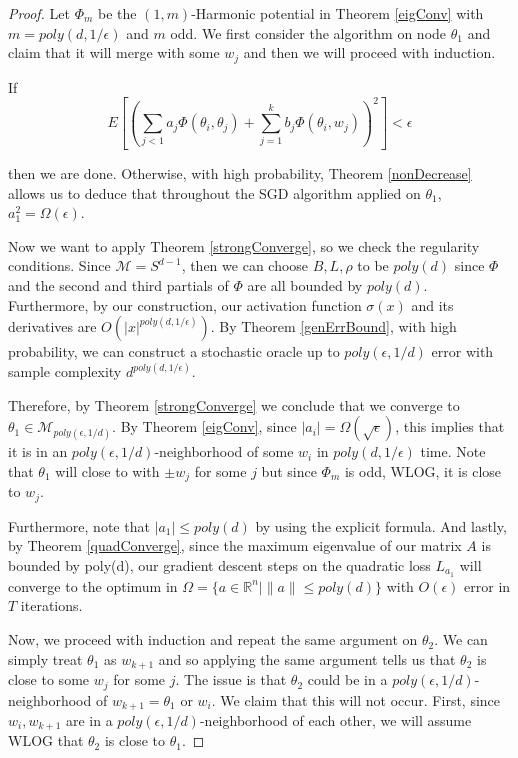 \documentclass{article}
\newcommand{\R}{{\mathbb{R}}}
\begin{document}
\begin{proof}

Let $\Phi_m$ be the $(1,m)$-Harmonic potential in Theorem \ref{eigConv} with $m = poly(d,1/\epsilon)$ and $m$ odd. We first consider the algorithm on node $\theta_1$ and claim that it will merge with some $w_j$ and then we will proceed with induction. 

If
%
\[ E\left[\left( \sum_{j < 1} a_j \Phi(\theta_i,\theta_j) + \sum_{j=1}^k b_j \Phi(\theta_i,w_j)\right)^2\right] < \epsilon\]

then we are done. Otherwise, with high probability, Theorem \ref{nonDecrease} allows us to deduce that throughout the SGD algorithm applied on $\theta_1$, $a_1^2 = \Omega(\epsilon)$. 

Now we want to apply Theorem \ref{strongConverge}, so we check the regularity conditions. Since $\mathcal{M} = S^{d-1}$, then we can choose $B, L, \rho$ to be $poly(d)$ since $\Phi$ and the second and third partials of $\Phi$ are all bounded by $poly(d)$. Furthermore, by our construction, our activation function $\sigma(x)$ and its derivatives are $O(|x|^{poly(d,1/\epsilon)})$. By Theorem \ref{genErrBound}, with high probability, we can construct a stochastic oracle up to $poly(\epsilon,1/d)$ error with sample complexity $d^{poly(d,1/\epsilon)}$.


Therefore, by Theorem \ref{strongConverge} we conclude that we converge to $\theta_1 \in \mathcal{M}_{poly(\epsilon,1/d)}$. By Theorem \ref{eigConv}, since $|a_i| = \Omega(\sqrt{\epsilon})$, this implies that it is in an $poly(\epsilon,1/d)$-neighborhood of some $w_{i}$ in $poly(d,1/\epsilon)$ time. Note that $\theta_1$ will close to with $\pm w_j$ for some $j$ but since $\Phi_m$ is odd, WLOG, it is close to $w_j$. 

Furthermore, note that $|a_1| \leq poly(d)$ by using the explicit formula. And lastly, by Theorem \ref{quadConverge}, since the maximum eigenvalue of our matrix $A$ is bounded by poly(d), our gradient descent steps on the quadratic loss $L_{a_1}$ will converge to the optimum in $\Omega = \{a \in \R^n | \|a\| \leq poly(d)\}$ with $O(\epsilon)$ error in $T$ iterations.

Now, we proceed with induction and repeat the same argument on $\theta_2$. We can simply treat $\theta_1$ as $w_{k+1}$ and so applying the same argument tells us that $\theta_2$ is close to some $w_j$ for some $j$. The issue is that $\theta_2$ could be in a $poly(\epsilon,1/d)$-neighborhood of $w_{k+1} = \theta_1$ or $w_i$. We claim that this will not occur. First, since $w_i, w_{k+1}$ are in a $poly(\epsilon,1/d)$-neighborhood of each other, we will assume WLOG that $\theta_2$ is close to $\theta_1$.


\end{proof}
\end{document}
